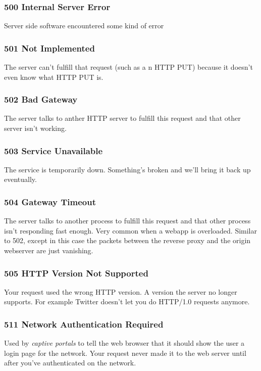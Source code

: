 \documentclass[../CMPUT-404-Notes.tex]{subfiles}
\begin{document}
\subsubsection{500 Internal Server Error}
Server side software encountered some kind of error

\subsubsection{501 Not Implemented}
The server can't fulfill that request (such as a n HTTP PUT) because it doesn't even know what HTTP PUT is. 

\subsubsection{502 Bad Gateway}
The server talks to anther HTTP server to fulfill this request and that other server isn't working. 

\subsubsection{503 Service Unavailable}
The service is temporarily down. Something's broken and we'll bring it back up eventually.

\subsubsection{504 Gateway Timeout}
The server talks to another process to fulfill this request and that other process isn't responding fast enough. Very common when a webapp is overloaded. 
Similar to 502, except in this case the packets between the reverse proxy and the origin webserver are just vanishing.

\subsubsection{505 HTTP Version Not Supported}
Your request used the wrong HTTP version. A version the server no longer supports. 
For example Twitter doesn't let you do HTTP/1.0 requests anymore.

\subsubsection{511 Network Authentication Required}
Used by \emph{captive portals} to tell the web browser that it should show the user a login page for the network. Your request never made it to the web server until after you've authenticated on the network.
\end{document}

